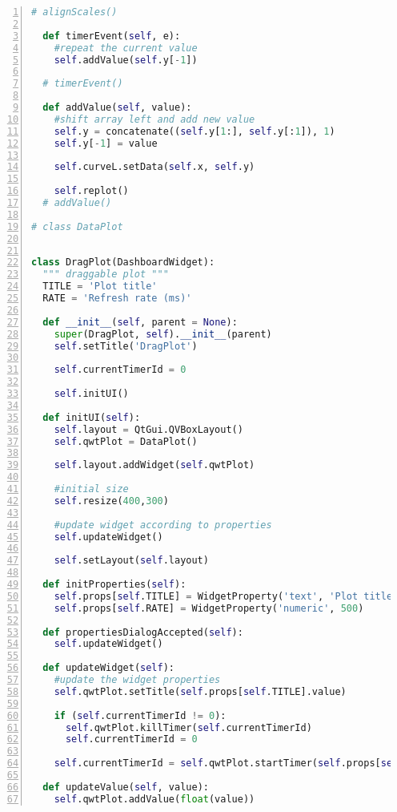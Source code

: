 \begin{lstlisting}[frame=single,caption={DragPlot implementation.},label=drag_plot_implementation,language=Python,numbers=left,breaklines=true]
  # alignScales()
  
  def timerEvent(self, e):
    #repeat the current value
    self.addValue(self.y[-1])

  # timerEvent()

  def addValue(self, value):
    #shift array left and add new value
    self.y = concatenate((self.y[1:], self.y[:1]), 1)
    self.y[-1] = value

    self.curveL.setData(self.x, self.y)

    self.replot()
  # addValue()

# class DataPlot


class DragPlot(DashboardWidget):
  """ draggable plot """
  TITLE = 'Plot title'
  RATE = 'Refresh rate (ms)'
  
  def __init__(self, parent = None):
    super(DragPlot, self).__init__(parent)
    self.setTitle('DragPlot')
    
    self.currentTimerId = 0
    
    self.initUI()
      
  def initUI(self):
    self.layout = QtGui.QVBoxLayout()
    self.qwtPlot = DataPlot()
    
    self.layout.addWidget(self.qwtPlot)
    
    #initial size
    self.resize(400,300)
    
    #update widget according to properties
    self.updateWidget()
    
    self.setLayout(self.layout)
      
  def initProperties(self):
    self.props[self.TITLE] = WidgetProperty('text', 'Plot title')
    self.props[self.RATE] = WidgetProperty('numeric', 500)
  
  def propertiesDialogAccepted(self):
    self.updateWidget()

  def updateWidget(self):
    #update the widget properties
    self.qwtPlot.setTitle(self.props[self.TITLE].value)

    if (self.currentTimerId != 0):
      self.qwtPlot.killTimer(self.currentTimerId)
      self.currentTimerId = 0

    self.currentTimerId = self.qwtPlot.startTimer(self.props[self.RATE].value)
      
  def updateValue(self, value):
    self.qwtPlot.addValue(float(value))
\end{lstlisting}

\newpage

